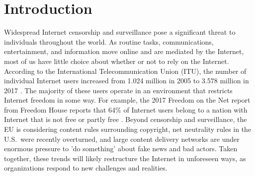 \documentclass[10pt, conference, letterpaper]{IEEEtran}
\newcommand{\toolname}{BGP-SAS }
\begin{document}

\section{Introduction}

\par Widespread Internet censorship and surveillance pose a
significant threat to individuals throughout the world. As routine
tasks, communications, entertainment, and information move online and
are mediated by the Internet, most of us have little choice about
whether or not to rely on the Internet.  According to the
International Telecommunication Union (ITU), the number of individual
Internet users increased from 1.024 million in 2005 to 3.578 million
in 2017 \cite{itu}. The majority of these users operate in an
environment that restricts Internet freedom in some way. For example,
the 2017 Freedom on the Net report from Freedom House reports that
64\% of Internet users belong to a nation with Internet that is not
free or partly free \cite{FOTN}.  Beyond censorship and surveillance,
the EU is considering content rules surrounding copyright, net
neutrality rules in the U.S.\ were recently overturned, and large
content delivery networks are under enormous pressure to 'do
something' about fake news and bad actors. Taken together, these
trends will likely restructure the Internet in unforeseen ways,
as organizations respond to new challenges and realities.
\end{document}
